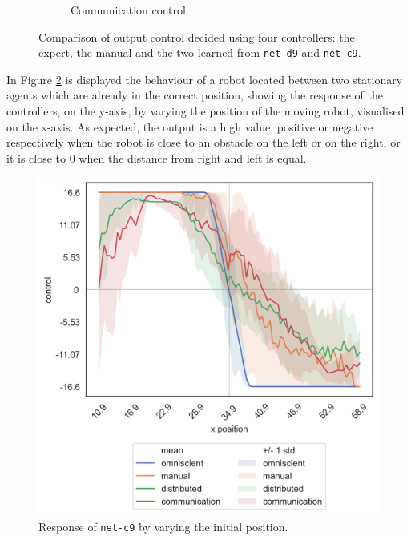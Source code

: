\begin{figure}[!htb]
\begin{center}
\begin{subfigure}[h]{0.35\textwidth}
			\caption{Communication control.}
		\end{subfigure}
	\end{center}
	\vspace{-0.5cm}
	\caption[Evaluation of the control decided by \texttt{net-c9}.]{Comparison of 
	output control decided using four controllers: the expert, the manual and the 
	two learned from \texttt{net-d9} and \texttt{net-c9}.}
	\label{fig:net-c9control}
\end{figure}

In Figure \ref{fig:net-c9responseposition} is displayed the behaviour of a robot 
located between two stationary agents which are already in the correct position, 
showing the response of the controllers, on the y-axis, by varying the position of 
the moving robot, visualised on the x-axis. As expected, the output is a high 
value, positive or negative respectively when the robot is close to an obstacle on 
the left or on the right, or it is close to $0$ when the distance from right and left 
is equal.
\begin{figure}[!htb]
	\centering
	\includegraphics[width=.45\textwidth]{contents/images/net-c9/response-varying_init_position-communication}%
	\caption{Response of \texttt{net-c9} by varying the initial position.}
	\label{fig:net-c9responseposition}
\end{figure}

